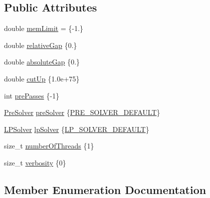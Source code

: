 \subsection*{Public Attributes}
\begin{DoxyCompactItemize}
\item 
double \hyperlink{structnifty_1_1ilp__backend_1_1IlpBackendSettings_a5f20f85b5528859b4ef8000a29fb1453}{mem\+Limit} = \{-\/1.\}
\item 
double \hyperlink{structnifty_1_1ilp__backend_1_1IlpBackendSettings_a8eed72b9ddbbc94a89197dde0d76d144}{relative\+Gap} \{0.\}
\item 
double \hyperlink{structnifty_1_1ilp__backend_1_1IlpBackendSettings_a8bc98f418844336847d868dd88e620f2}{absolute\+Gap} \{0.\}
\item 
double \hyperlink{structnifty_1_1ilp__backend_1_1IlpBackendSettings_a0bd7c55efdd7c642687b17e378da2e08}{cut\+Up} \{1.\+0e+75\}
\item 
int \hyperlink{structnifty_1_1ilp__backend_1_1IlpBackendSettings_a87cbc1618cd7cd2d88de2da14ff8c2d3}{pre\+Passes} \{-\/1\}
\item 
\hyperlink{structnifty_1_1ilp__backend_1_1IlpBackendSettings_ad16c71cc049dcb37c07f2abdda69dab4}{Pre\+Solver} \hyperlink{structnifty_1_1ilp__backend_1_1IlpBackendSettings_af1e71695a4bd0dd0921ba2db7c0208c6}{pre\+Solver} \{\hyperlink{structnifty_1_1ilp__backend_1_1IlpBackendSettings_ad16c71cc049dcb37c07f2abdda69dab4a45adcc6c0d30422e0c0a674b2fe92a37}{P\+R\+E\+\_\+\+S\+O\+L\+V\+E\+R\+\_\+\+D\+E\+F\+A\+U\+L\+T}\}
\item 
\hyperlink{structnifty_1_1ilp__backend_1_1IlpBackendSettings_a4b3fd0d313a8d95f9f6a3ba64802e204}{L\+P\+Solver} \hyperlink{structnifty_1_1ilp__backend_1_1IlpBackendSettings_aa0940a3d1d8399b9ed10f7e43d61e8cc}{lp\+Solver} \{\hyperlink{structnifty_1_1ilp__backend_1_1IlpBackendSettings_a4b3fd0d313a8d95f9f6a3ba64802e204a24fa810f69bf55c40d68082a2e3653f8}{L\+P\+\_\+\+S\+O\+L\+V\+E\+R\+\_\+\+D\+E\+F\+A\+U\+L\+T}\}
\item 
size\+\_\+t \hyperlink{structnifty_1_1ilp__backend_1_1IlpBackendSettings_ae9852b9ee86048c11366c7248ca8dbfd}{number\+Of\+Threads} \{1\}
\item 
size\+\_\+t \hyperlink{structnifty_1_1ilp__backend_1_1IlpBackendSettings_aecafa6adf4695088d0396f232bbe88ba}{verbosity} \{0\}
\end{DoxyCompactItemize}


\subsection{Member Enumeration Documentation}
\hypertarget{structnifty_1_1ilp__backend_1_1IlpBackendSettings_a4b3fd0d313a8d95f9f6a3ba64802e204}{}
